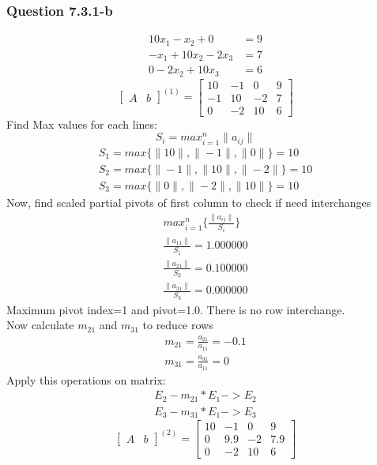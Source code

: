 \documentclass{article}
\begin{document}
\subsubsection{Question 7.3.1-b}
\begin{align}
\label{q7.3.1.b.1}10x_{1}-x_{2}+0&=9 \\
\label{q7.3.1.b.2}-x_{1}+10x_{2}-2x_{3}&=7 \\
\label{q7.3.1.b.3}0-2x_{2}+10x_{3}&=6
\end{align}
\[
\left[
\begin{array}{c|c}
A&b
\end{array}
\right]^{(1)}
=
\left[
\begin{array}{ccc|c}
	10&-1&0&9\\
	-1&10&-2&7\\
	0&-2&10&6 
\end{array}
\right]
\]
Find Max values for each lines: 
\begin{equation}
\label{findSMax}S_{i}=max_{i=1}^n\|a_{ij}\|
\end{equation}
\begin{align}
	S_{1}=max\{\|10\|,\|-1\|,\|0\|\}=10\\
	S_{2}=max\{\|-1\|,\|10\|,\|-2\|\}=10\\
	S_{3}=max\{\|0\|,\|-2\|,\|10\|\}=10
\end{align}
Now, find scaled partial pivots of first column to check if need interchanges
\begin{align}
	max_{i=1}^n\{\frac{\|a_{ij}\|}{S_{i}}\}\\
	\frac{\|a_{11}\|}{S_{1}}=1.000000\\
	\frac{\|a_{21}\|}{S_{2}}=0.100000\\
	\frac{\|a_{31}\|}{S_{3}}=0.000000
\end{align}
Maximum pivot index=1 and pivot=1.0. There is no row interchange.\\
Now calculate $m_{21}$ and $m_{31}$ to reduce rows 
\begin{align}
	m_{21}=\frac{a_{21}}{a_{11}}=-0.1\\
	m_{31}=\frac{a_{31}}{a_{11}}=0
\end{align}
Apply this operations on matrix:
\begin{align}
	E_{2}-m_{21}*E_{1}->E_{2}\\
	E_{3}-m_{31}*E_{1}->E_{3}
\end{align}
\[
\left[
\begin{array}{c|c}
A&b
\end{array}
\right]^{(2)}
=
\left[
\begin{array}{ccc|c}
	10&-1&0&9\\
	0&9.9&-2&7.9\\
	0&-2&10&6 
\end{array}
\right]
\]
\end{document}
